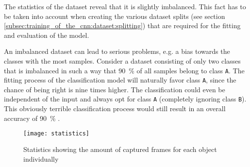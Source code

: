 The statistics of the dataset reveal that it is slightly imbalanced.
This fact has to be taken into account when creating the various dataset splits (see section \ref{subsec:training_of_the_cnn:dataset:splitting}) that are required for the fitting and evaluation of the model.

An imbalanced dataset can lead to serious problems, e.g. a bias towards the classes with the most samples.
Consider a dataset consisting of only two classes that is imbalanced in such a way that \SI{90}{\percent} of all samples belong to class \texttt{A}.
The fitting process of the classification model will naturally favor class \texttt{A}, since the chance of being right is nine times higher.
The classification could even be independent of the input and always opt for class \texttt{A} (completely ignoring class \texttt{B}).
This obviously terrible classification process would still result in an overall accuracy of \SI{90}{\percent} \cite{training_imbalanced}.


\begin{figure}
  \centering
  \texttt{[image: statistics]}
  \caption{Statistics showing the amount of captured frames for each object individually}
  \label{fig:statistics}
\end{figure}





















